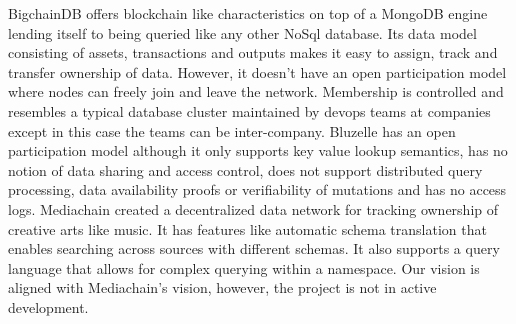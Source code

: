 BigchainDB \cite{bigchaindb} offers blockchain like characteristics on top of a MongoDB engine lending itself to being queried like any other NoSql database. Its data model consisting of assets, transactions and outputs makes it easy to assign, track and transfer ownership of data. However, it doesn't have an open participation model where nodes can freely join and leave the network. Membership is controlled and resembles a typical database cluster maintained by devops teams at companies except in this case the teams can be inter-company. Bluzelle \cite{bluzelle} has an open participation model although it only supports key value lookup semantics, has no notion of data sharing and access control, does not support distributed query processing, data availability proofs or verifiability of mutations and has no access logs. Mediachain \cite{mediachain} created a decentralized data network for tracking ownership of creative arts like music. It has features like automatic schema translation that enables searching across sources with different schemas. It also supports a query language that allows for complex querying within a namespace. Our vision is aligned with Mediachain's vision, however, the project is not in active development.



